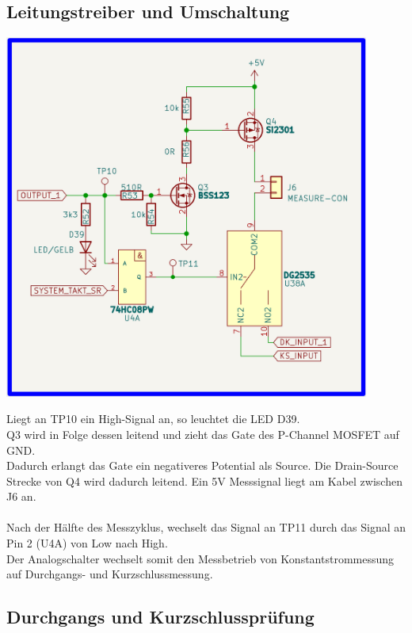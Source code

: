 \newpage
\subsection{Leitungstreiber und Umschaltung}

\begin{center}
\includegraphics[width=12cm]{Bilder/Leitungstreiber.png}
\end{center}

Liegt an TP10 ein High-Signal an, so leuchtet die LED D39.
\\
Q3 wird in Folge dessen leitend und zieht das Gate des P-Channel MOSFET auf GND. 
\\
Dadurch erlangt das Gate ein negativeres Potential als Source. Die Drain-Source Strecke von Q4 wird dadurch leitend. Ein 5V Messsignal liegt am Kabel zwischen J6 an. 
\\
\\
Nach der Hälfte des Messzyklus, wechselt das Signal an TP11 durch das Signal an Pin 2 (U4A) von Low nach High. 
\\
Der Analogschalter wechselt somit den Messbetrieb von Konstantstrommessung auf Durchgangs- und Kurzschlussmessung.

\newpage
\subsection{Durchgangs und Kurzschlussprüfung}

